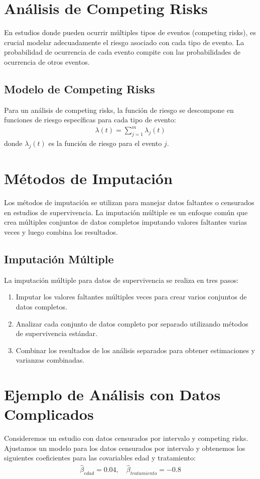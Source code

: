 \section{An\'alisis de Competing Risks}
En estudios donde pueden ocurrir m\'ultiples tipos de eventos (competing risks), es crucial modelar adecuadamente el riesgo asociado con cada tipo de evento. La probabilidad de ocurrencia de cada evento compite con las probabilidades de ocurrencia de otros eventos.

\subsection{Modelo de Competing Risks}
Para un an\'alisis de competing risks, la funci\'on de riesgo se descompone en funciones de riesgo espec\'ificas para cada tipo de evento:
\begin{eqnarray*}
\lambda(t) = \sum_{j=1}^m \lambda_j(t)
\end{eqnarray*}
donde $\lambda_j(t)$ es la funci\'on de riesgo para el evento $j$.

\section{M\'etodos de Imputaci\'on}
Los m\'etodos de imputaci\'on se utilizan para manejar datos faltantes o censurados en estudios de supervivencia. La imputaci\'on m\'ultiple es un enfoque com\'un que crea m\'ultiples conjuntos de datos completos imputando valores faltantes varias veces y luego combina los resultados.

\subsection{Imputaci\'on M\'ultiple}
La imputaci\'on m\'ultiple para datos de supervivencia se realiza en tres pasos:
\begin{enumerate}
    \item Imputar los valores faltantes m\'ultiples veces para crear varios conjuntos de datos completos.
    \item Analizar cada conjunto de datos completo por separado utilizando m\'etodos de supervivencia est\'andar.
    \item Combinar los resultados de los an\'alisis separados para obtener estimaciones y varianzas combinadas.
\end{enumerate}

\section{Ejemplo de An\'alisis con Datos Complicados}
Consideremos un estudio con datos censurados por intervalo y competing risks. Ajustamos un modelo para los datos censurados por intervalo y obtenemos los siguientes coeficientes para las covariables edad y tratamiento:
\begin{eqnarray*}
\hat{\beta}_{edad} = 0.04, \quad \hat{\beta}_{tratamiento} = -0.8
\end{eqnarray*}

